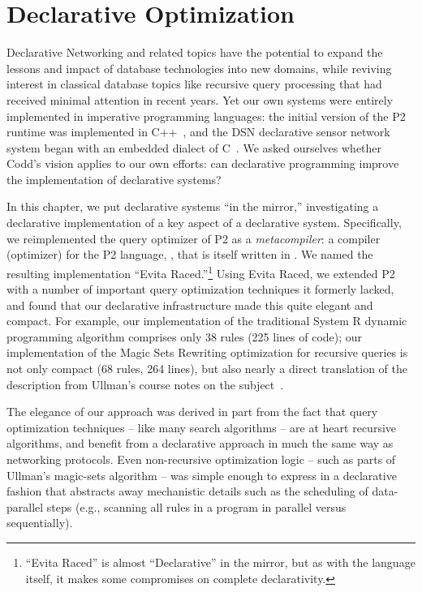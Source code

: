 \chapter[Declarative Optimization]{Declarative Optimization}
\label{ch:evita}

Declarative Networking and related topics have the potential to expand the lessons and 
impact of database technologies into new domains, while reviving interest in classical 
database topics like recursive query processing that had received minimal attention in 
recent years.  Yet our own systems were entirely implemented in imperative programming
languages: the initial version of the P2 runtime was implemented in C++~\cite{p2:sosp}, 
and the DSN declarative sensor network system began with an embedded dialect 
of C~\cite{chu-sensys07}. We asked ourselves whether Codd's vision applies to our own 
efforts: can declarative programming improve the implementation of declarative systems?

In this chapter, we put declarative systems ``in the mirror,''
investigating a declarative implementation of a key aspect of a
declarative system.  Specifically, we reimplemented the query
optimizer of P2 as a {\em metacompiler}: a compiler (optimizer) for the
P2 language, \OVERLOG, that is itself written in \OVERLOG.  We named the
resulting implementation ``Evita Raced.''\footnote{``Evita Raced'' is
almost ``Declarative'' in the mirror, but as with the \OVERLOG language
itself, it makes some compromises on complete declarativity.}  Using
Evita Raced, we extended P2 with a number of important query
optimization techniques it formerly lacked, and found that our
declarative infrastructure made this quite elegant and compact. For
example, our implementation of the traditional System R dynamic
programming algorithm comprises only 38 \OVERLOG rules (225 lines of
code); our implementation of the Magic Sets Rewriting optimization for
recursive queries is not only compact (68 rules, 264 lines), but also
nearly a direct translation of the description from Ullman's course
notes on the subject~\cite{ullmanNotes}.   

The elegance of our approach was derived in part from the fact that query optimization 
techniques -- like many search algorithms -- are at heart recursive algorithms, and
benefit from a declarative approach in much the same way as networking
protocols.  Even non-recursive optimization logic -- such as parts of
Ullman's magic-sets algorithm -- was simple enough to express in a
declarative fashion that abstracts away mechanistic details such as the
scheduling of data-parallel steps (e.g., scanning all rules in a program
in parallel versus sequentially).

